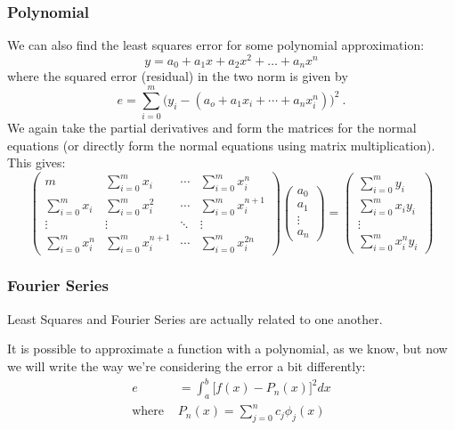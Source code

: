 \documentclass[12pt, answers]{exam}
\begin{document}
\subsubsection*{Polynomial}
We can also find the least squares error for some polynomial approximation:
%
\[y = a_0 + a_1 x + a_2 x^2 + \dots +a_n x^n\]
%
where the squared error (residual) in the two norm is given by
%
\[e = \sum_{i=0}^m \bigl(y_i - (a_o + a_1 x_i+ \cdots + a_n x_i^n)\bigr)^2 \:.\]
%
We again take the partial derivatives and form the matrices for the normal equations (or directly form the normal equations using matrix multiplication). This gives:
%
\begin{equation}
\begin{pmatrix}
m                & \sum_{i=0}^m x_i & \cdots & \sum_{i=0}^m x_i^n \\
\sum_{i=0}^m x_i & \sum_{i=0}^m x_i^2 & \cdots & \sum_{i=0}^m x_i^{n+1} \\ 
\vdots & \vdots & \ddots & \vdots \\
\sum_{i=0}^m x_i^n & \sum_{i=0}^m x_i^{n+1} & \cdots & \sum_{i=0}^m x_i^{2n}
\end{pmatrix}
\begin{pmatrix}
a_0 \\ a_1 \\ \vdots \\ a_n
\end{pmatrix} =
\begin{pmatrix}
\sum_{i=0}^m y_i \\ \sum_{i=0}^m x_i y_i \\ \vdots \\ \sum_{i=0}^m x_i^n y_i \nonumber
\end{pmatrix}
\end{equation}

\subsubsection*{Fourier Series}
Least Squares and Fourier Series are actually related to one another. 

It is possible to approximate a function with a polynomial, as we know, but now we will write the way we're considering the error a bit differently:
%
\ifprintanswers
\begin{align}
e &=\int_a^b \bigl[f(x) - P_n(x)\bigr]^2 dx \nonumber\\
\text{where }& P_n(x) = \sum_{j=0}^{n} c_j \phi_j(x) \nonumber
\end{align}
\else
\\\vspace*{5em}
\fi
\end{document}

